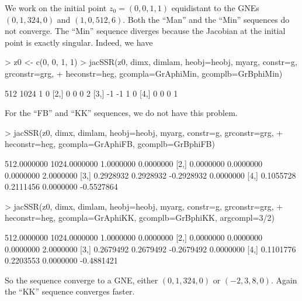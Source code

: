 \documentclass[11pt]{article}
\begin{document}
We work on the initial point $z_0 = (0, 0, 1,  1)$ equidistant to the GNEs $(0, 1, 324, 0)$ and $(1, 0, 512, 6)$. Both the ``Man'' and the ``Min'' sequences do not converge. The ``Min'' sequence diverges because the Jacobian at the initial point is exactly singular. Indeed, we have
\begin{Schunk}
\begin{Sinput}
> z0 <- c(0, 0, 1, 1)
> jacSSR(z0, dimx, dimlam, heobj=heobj, myarg, constr=g, grconstr=grg, 
+ 	heconstr=heg, gcompla=GrAphiMin, gcomplb=GrBphiMin)
\end{Sinput}
\begin{Soutput}
     [,1] [,2] [,3] [,4]
[1,]  512 1024    1    0
[2,]    0    0    0    2
[3,]   -1   -1    1    0
[4,]    0    0    0    1
\end{Soutput}
\end{Schunk}
For the ``FB'' and ``KK'' sequences, we do not have this problem.
\begin{Schunk}
\begin{Sinput}
> jacSSR(z0, dimx, dimlam, heobj=heobj, myarg, constr=g, grconstr=grg, 
+ 	heconstr=heg, gcompla=GrAphiFB, gcomplb=GrBphiFB)
\end{Sinput}
\begin{Soutput}
            [,1]         [,2]       [,3]       [,4]
[1,] 512.0000000 1024.0000000  1.0000000  0.0000000
[2,]   0.0000000    0.0000000  0.0000000  2.0000000
[3,]   0.2928932    0.2928932 -0.2928932  0.0000000
[4,]   0.1055728    0.2111456  0.0000000 -0.5527864
\end{Soutput}
\begin{Sinput}
> jacSSR(z0, dimx, dimlam, heobj=heobj, myarg, constr=g, grconstr=grg, 
+ 	heconstr=heg, gcompla=GrAphiKK, gcomplb=GrBphiKK, argcompl=3/2)
\end{Sinput}
\begin{Soutput}
            [,1]         [,2]       [,3]       [,4]
[1,] 512.0000000 1024.0000000  1.0000000  0.0000000
[2,]   0.0000000    0.0000000  0.0000000  2.0000000
[3,]   0.2679492    0.2679492 -0.2679492  0.0000000
[4,]   0.1101776    0.2203553  0.0000000 -0.4881421
\end{Soutput}
\end{Schunk}
So the sequence converge to a GNE, either $(0, 1, 324, 0)$ or $(-2, 3, 8, 0)$. Again the ``KK'' sequence converges faster.
\end{document}
